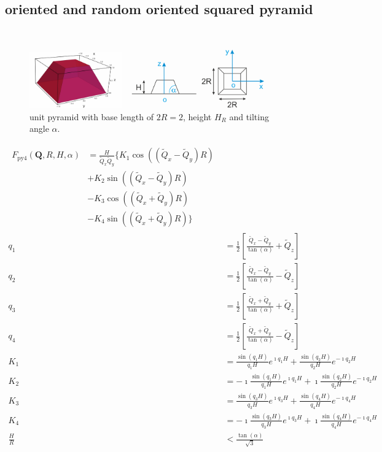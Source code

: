 \subsection{oriented and random oriented squared pyramid} ~\\
\cite{Renaud2009}
\begin{figure}[htb]
\begin{center}
\includegraphics[width=0.9\textwidth]{../images/form_factor/oriented_primitive_opbjects/pyramid4.png}
\end{center}
\caption{unit pyramid with base length of $2R=2$, height $H_R$ and tilting angle $\alpha$.}
\label{fig:opo_pyramid4}
\end{figure}
\begin{align}\label{eq:opo_pyramid4}
\begin{split}
 F_\mathrm{py4}(\mathbf{Q},R,H,\alpha) & = \frac{H}{\tilde{Q}_x\tilde{Q}_y} \bigg\{
        K_1\cos\left(\left(\tilde{Q}_x-\tilde{Q}_y\right)R\right) \\
      & + K_2\sin\left(\left(\tilde{Q}_x-\tilde{Q}_y\right)R\right) \\
      & - K_3\cos\left(\left(\tilde{Q}_x+\tilde{Q}_y\right)R\right) \\
      & - K_4\sin\left(\left(\tilde{Q}_x+\tilde{Q}_y\right)R\right)\bigg\}
\end{split} \\
  q_1 & =\frac12 \left[\frac{\tilde{Q}_x-\tilde{Q}_y}{\tan(\alpha)}+\tilde{Q}_z\right]\\
  q_2 & =\frac12 \left[\frac{\tilde{Q}_x-\tilde{Q}_y}{\tan(\alpha)}-\tilde{Q}_z\right]\\
  q_3 & =\frac12 \left[\frac{\tilde{Q}_x+\tilde{Q}_y}{\tan(\alpha)}+\tilde{Q}_z\right]\\
  q_4 & =\frac12 \left[\frac{\tilde{Q}_x+\tilde{Q}_y}{\tan(\alpha)}-\tilde{Q}_z\right] \\
  K_1 &= \frac{\sin(q_1H)}{q_1H} e^{\imath q_1H}+\frac{\sin(q_2H)}{q_2H} e^{-\imath q_2H}\\
  K_2 &= -\imath \frac{\sin(q_1H)}{q_1H} e^{\imath q_1H}+\imath \frac{\sin(q_2H)}{q_2H} e^{-\imath q_2H}\\
  K_3 &= \frac{\sin(q_3H)}{q_3H} e^{\imath q_3H}+\frac{\sin(q_4H)}{q_4H} e^{-\imath q_4H}\\
  K_4 &= -\imath \frac{\sin(q_3H)}{q_3H} e^{\imath q_3H}+\imath \frac{\sin(q_4H)}{q_4H} e^{-\imath q_4H}\\
  \frac{H}{R} & < \frac{\tan(\alpha)}{\sqrt{3}}
\end{align}

